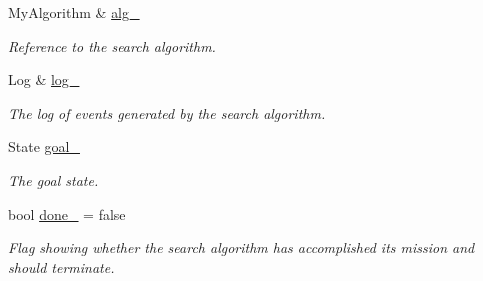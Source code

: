 \begin{DoxyCompactItemize}
\item 
My\+Algorithm \& \hyperlink{structslb_1_1ext_1_1policy_1_1goalHandler_1_1SingleGoal_a5c7115f5f99c3e8639e98a28a39c57e5}{alg\+\_\+}\hypertarget{structslb_1_1ext_1_1policy_1_1goalHandler_1_1SingleGoal_a5c7115f5f99c3e8639e98a28a39c57e5}{}\label{structslb_1_1ext_1_1policy_1_1goalHandler_1_1SingleGoal_a5c7115f5f99c3e8639e98a28a39c57e5}

\begin{DoxyCompactList}\small\item\em Reference to the search algorithm. \end{DoxyCompactList}\item 
Log \& \hyperlink{structslb_1_1ext_1_1policy_1_1goalHandler_1_1SingleGoal_adf802a1ed7bb4f7abe9d9e8fa5dc95bb}{log\+\_\+}\hypertarget{structslb_1_1ext_1_1policy_1_1goalHandler_1_1SingleGoal_adf802a1ed7bb4f7abe9d9e8fa5dc95bb}{}\label{structslb_1_1ext_1_1policy_1_1goalHandler_1_1SingleGoal_adf802a1ed7bb4f7abe9d9e8fa5dc95bb}

\begin{DoxyCompactList}\small\item\em The log of events generated by the search algorithm. \end{DoxyCompactList}\item 
State \hyperlink{structslb_1_1ext_1_1policy_1_1goalHandler_1_1SingleGoal_a586bc8112895fd741f7f4abbe5cd479d}{goal\+\_\+}\hypertarget{structslb_1_1ext_1_1policy_1_1goalHandler_1_1SingleGoal_a586bc8112895fd741f7f4abbe5cd479d}{}\label{structslb_1_1ext_1_1policy_1_1goalHandler_1_1SingleGoal_a586bc8112895fd741f7f4abbe5cd479d}

\begin{DoxyCompactList}\small\item\em The goal state. \end{DoxyCompactList}\item 
bool \hyperlink{structslb_1_1ext_1_1policy_1_1goalHandler_1_1SingleGoal_a02f6848a620bbfa49376d6f93fc6e106}{done\+\_\+} = false\hypertarget{structslb_1_1ext_1_1policy_1_1goalHandler_1_1SingleGoal_a02f6848a620bbfa49376d6f93fc6e106}{}\label{structslb_1_1ext_1_1policy_1_1goalHandler_1_1SingleGoal_a02f6848a620bbfa49376d6f93fc6e106}

\begin{DoxyCompactList}\small\item\em Flag showing whether the search algorithm has accomplished its mission and should terminate. \end{DoxyCompactList}\end{DoxyCompactItemize}


